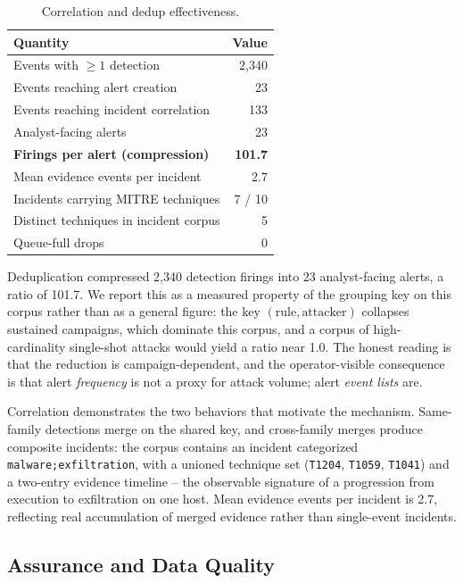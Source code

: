 \documentclass[conference]{IEEEtran}
\begin{document}
\begin{table}[t]
\caption{Correlation and dedup effectiveness.}
\label{tab:reduction}
\centering
\small
\begin{tabular}{@{}lr@{}}
\toprule
\textbf{Quantity} & \textbf{Value} \\
\midrule
Events with $\geq 1$ detection & 2{,}340 \\
Events reaching alert creation & 23 \\
Events reaching incident correlation & 133 \\
Analyst-facing alerts & 23 \\
\textbf{Firings per alert (compression)} & \textbf{101.7} \\
Mean evidence events per incident & 2.7 \\
Incidents carrying MITRE techniques & 7 / 10 \\
Distinct techniques in incident corpus & 5 \\
Queue-full drops & 0 \\
\bottomrule
\end{tabular}
\end{table}

Deduplication compressed 2{,}340 detection firings into 23 analyst-facing
alerts, a ratio of 101.7. We report this as a measured property of the
grouping key on this corpus rather than as a general figure: the key
$(\text{rule}, \text{attacker})$ collapses sustained campaigns, which
dominate this corpus, and a corpus of high-cardinality single-shot attacks
would yield a ratio near 1.0. The honest reading is that the reduction is
campaign-dependent, and the operator-visible consequence is that alert
\emph{frequency} is not a proxy for attack volume; alert
\emph{event lists} are.

Correlation demonstrates the two behaviors that motivate the mechanism.
Same-family detections merge on the shared key, and cross-family merges
produce composite incidents: the corpus contains an incident categorized
\texttt{malware;exfiltration}, with a unioned technique set
(\texttt{T1204}, \texttt{T1059}, \texttt{T1041}) and a two-entry evidence
timeline -- the observable signature of a progression from execution to
exfiltration on one host. Mean evidence events per incident is 2.7,
reflecting real accumulation of merged evidence rather than single-event
incidents.

\subsection{Assurance and Data Quality}
\end{document}
